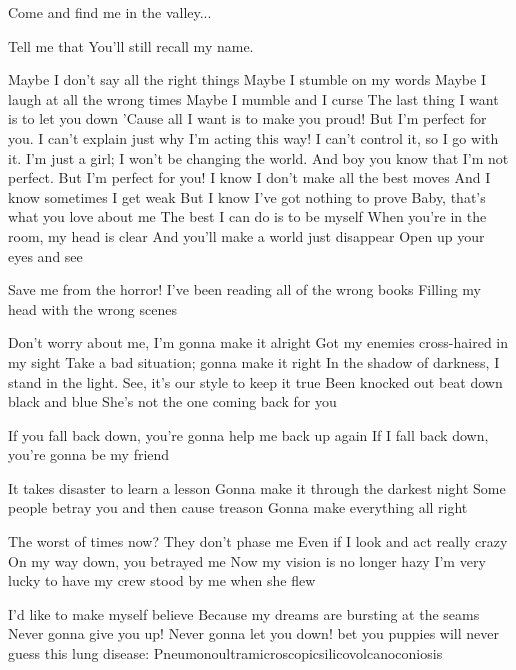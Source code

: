 Come and find me in the valley...

Tell me that You'll still recall my name.


Maybe I don't say all the right things
Maybe I stumble on my words
Maybe I laugh at all the wrong times
Maybe I mumble and I curse
The last thing I want is to let you down
'Cause all I want is to make you proud!
But I'm perfect for you.
I can't explain just why I'm acting this way!
I can't control it, so I go with it.
I'm just a girl; I won't be changing the world.
And boy you know that I'm not perfect.
But I'm perfect for you!
I know I don't make all the best moves
And I know sometimes I get weak
But I know I've got nothing to prove
Baby, that's what you love about me
The best I can do is to be myself
When you're in the room, my head is clear
And you'll make a world just disappear
Open up your eyes and see


Save me from the horror!
I've been reading all of the wrong books
Filling my head with the wrong scenes

Don't worry about me, I'm gonna make it alright
Got my enemies cross-haired in my sight
Take a bad situation; gonna make it right
In the shadow of darkness, I stand in the light.
See, it's our style to keep it true
Been knocked out beat down black and blue
She's not the one coming back for you

If you fall back down, you're gonna help me back up again
If I fall back down, you're gonna be my friend

It takes disaster to learn a lesson
Gonna make it through the darkest night
Some people betray you and then cause treason
Gonna make everything all right

The worst of times now? They don't phase me
Even if I look and act really crazy
On my way down, you betrayed me
Now my vision is no longer hazy
I'm very lucky to have my crew stood by me when she flew

%
%
%

I'd like to make myself believe
Because my dreams are bursting at the seams
Never gonna give you up! Never gonna let you down!
bet you puppies will never guess this lung disease: Pneumonoultramicroscopicsilicovolcanoconiosis

